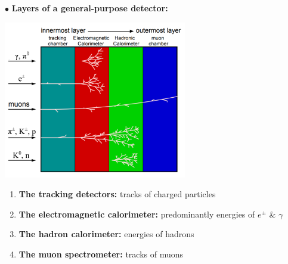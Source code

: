 \documentclass[9pt,a4paper,unknownkeysallowed,xcolor=dvipsnames,aspectratio=43]{beamer}
\begin{document}
%
%
\begin{frame}

{\color{darkred}\Large$\bullet$} {\bf Layers of a general-purpose detector:}
\begin{center}
\includegraphics[width=0.6\textwidth]{01/detection.png}
\end{center}
\begin{enumerate}
    \item {\bf The tracking detectors:} tracks of charged particles
    \item {\bf The electromagnetic calorimeter:} predominantly energies of $e^\pm$ \& $\gamma$
    \item {\bf The hadron calorimeter:} energies of hadrons
    \item {\bf The muon spectrometer:} tracks of muons
\end{enumerate}
\end{frame}
%
%
\end{document}
